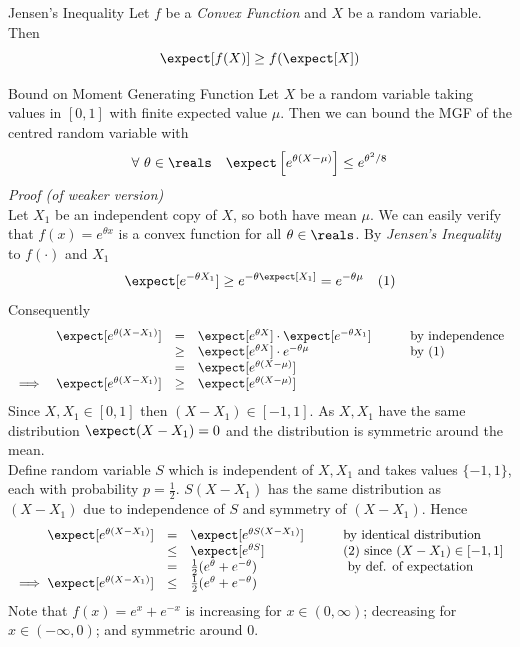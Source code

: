 \documentclass[11pt,a4paper]{article}
\begin{document}
\begin{theorem}{Jensen's Inequality}
  Let $f$ be a \textit{Convex Function} and $X$ be a random variable. Then
  \[ \expect[f(X)]\geq f(\expect[X]) \]
\end{theorem}

\begin{theorem}{Bound on Moment Generating Function}
  Let $X$ be a random variable taking values in $[0,1]$ with finite expected value $\mu$. Then we can bound the MGF of the centred random variable with
  \[ \forall\ \theta\in\reals\quad\expect\left[e^{\theta(X-\mu)}\right]\leq e^{\theta^2/8} \]
  \textit{Proof (of weaker version)}\\
  Let $X_1$ be an independent copy of $X$, so both have mean $\mu$. We can easily verify that $f(x)=e^{\theta x}$ is a convex function for all $\theta\in\reals$. By \textit{Jensen's Inequality} to $f(\cdot)$ and $X_1$
  \[ \expect[e^{-\theta X_1}]\geq e^{-\theta\expect[X_1]}=e^{-\theta\mu}\quad(1) \]
  Consequently
  \[\begin{array}{rrclll}
  &\expect[e^{\theta(X-X_1)}]&=&\expect[e^{\theta X}]\cdot\expect[e^{-\theta X_1}]&\quad&\text{by independence}\\
  &&\geq&\expect[e^{\theta X}]\cdot e^{-\theta\mu}&&\text{by (1)}\\
  &&=&\expect[e^{\theta(X-\mu)}]\\
  \implies&\expect[e^{\theta(X-X_1)}]&\geq&\expect[e^{\theta(X-\mu)}]
  \end{array}\]
  Since $X,X_1\in[0,1]$ then $(X-X_1)\in[-1,1]$. As $X,X_1$ have the same distribution $\expect(X-X_1)=0$ and the distribution is symmetric around the mean.\\
  Define random variable $S$ which is independent of $X,X_1$ and takes values $\{-1,1\}$, each with probability $p=\frac12$. $S(X-X_1)$ has the same distribution as $(X-X_1)$ due to independence of $S$ and symmetry of $(X-X_1)$. Hence
  \[\begin{array}{rclll}
    \expect[e^{\theta(X-X_1)}]&=&\expect[e^{\theta S(X-X_1)}]&\quad&\text{by identical distribution}\\
    &\leq&\expect[e^{\theta S}]&&(2)\text{ since }(X-X_1)\in[-1,1]\\
    &=&\frac12(e^\theta+e^{-\theta})&&\text{ by def. of expectation}\\
    \implies\expect[e^{\theta(X-X_1)}]&\leq&\frac12(e^\theta+e^{-\theta})
  \end{array}\]
  Note that $f(x)=e^x+e^{-x}$ is increasing for $x\in(0,\infty)$; decreasing for $x\in(-\infty,0)$; and symmetric around $0$.\\

\end{theorem}
\end{document}
